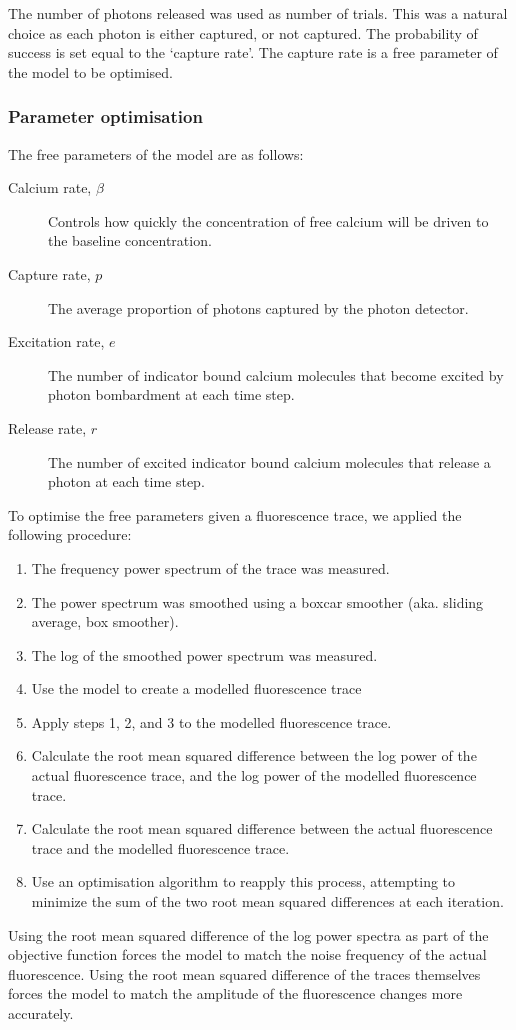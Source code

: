 \documentclass[a4paper,12pt]{article}
\theoremstyle{definition}
\begin{document}
The number of photons released was used as number of trials. This was a natural choice as each photon is either captured, or not captured. The probability of success is set equal to the `capture rate'. The capture rate is a free parameter of the model to be optimised.

\subsubsection{Parameter optimisation} \label{sec:opt_params}
The free parameters of the model are as follows:
\begin{description}
  \item[Calcium rate, $\beta$] Controls how quickly the concentration of free calcium will be driven to the baseline concentration.
  \item[Capture rate, $p$] The average proportion of photons captured by the photon detector.
  \item[Excitation rate, $e$] The number of indicator bound calcium molecules that become excited by photon bombardment at each time step.
  \item[Release rate, $r$] The number of excited indicator bound calcium molecules that release a photon at each time step.
\end{description}
To optimise the free parameters given a fluorescence trace, we applied the following procedure:
\begin{enumerate}
  \item The frequency power spectrum of the trace was measured.
  \item The power spectrum was smoothed using a boxcar smoother (aka. sliding average, box smoother).
  \item The log of the smoothed power spectrum was measured.
  \item Use the model to create a modelled fluorescence trace
  \item Apply steps 1, 2, and 3 to the modelled fluorescence trace.
  \item Calculate the root mean squared difference between the log power of the actual fluorescence trace, and the log power of the modelled fluorescence trace.
  \item Calculate the root mean squared difference between the actual fluorescence trace and the modelled fluorescence trace.
  \item Use an optimisation algorithm to reapply this process, attempting to minimize the sum of the two root mean squared differences at each iteration.
\end{enumerate}
Using the root mean squared difference of the log power spectra as part of the objective function forces the model to match the noise frequency of the actual fluorescence. Using the root mean squared difference of the traces themselves forces the model to match the amplitude of the fluorescence changes more accurately. %
\end{document}
